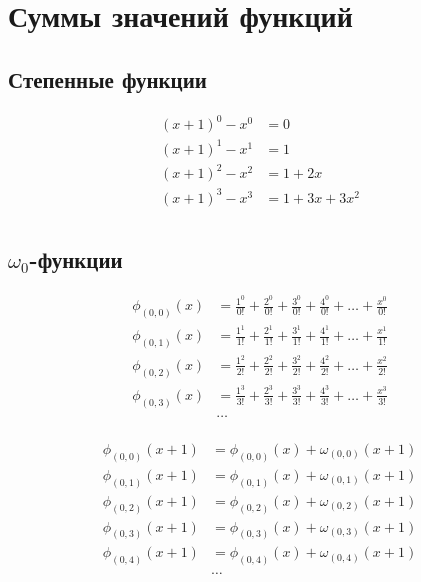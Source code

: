 
\section{Суммы значений функций}

\subsection{Степенные функции}

\begin{equation*}\begin{aligned}
(x + 1)^0 - x^0 &= 0 \\
(x + 1)^1 - x^1 &= 1 \\
(x + 1)^2 - x^2 &= 1 + 2x \\
(x + 1)^3 - x^3 &= 1 + 3x + 3x^2 \\
\end{aligned}\end{equation*}

\subsection{$\omega_0$-функции}

\begin{equation*} \begin{aligned}
\phi_{(0,0)}(x) &=
  \frac{1^0}{0!} 
+ \frac{2^0}{0!} 
+ \frac{3^0}{0!} 
+ \frac{4^0}{0!} 
+ \ldots 
+ \frac{x^0}{0!} \\
%
\phi_{(0,1)}(x) &= 
  \frac{1^1}{1!} 
+ \frac{2^1}{1!} 
+ \frac{3^1}{1!} 
+ \frac{4^1}{1!} 
+ \ldots 
+ \frac{x^1}{1!} \\
%
\phi_{(0,2)}(x) &= 
  \frac{1^2}{2!} 
+ \frac{2^2}{2!} 
+ \frac{3^2}{2!} 
+ \frac{4^2}{2!} 
+ \ldots 
+ \frac{x^2}{2!} \\
%
\phi_{(0,3)}(x) &= 
  \frac{1^3}{3!} 
+ \frac{2^3}{3!} 
+ \frac{3^3}{3!} 
+ \frac{4^3}{3!} 
+ \ldots 
+ \frac{x^3}{3!} \\
%
&\ldots \\
\end{aligned} \end{equation*}

\begin{equation*} \begin{aligned}
\phi_{(0,0)}(x + 1) &= 
  \phi_{(0,0)}(x) + \omega_{(0,0)}(x + 1)
\\
\phi_{(0,1)}(x + 1) &= 
  \phi_{(0,1)}(x) + \omega_{(0,1)}(x + 1)  
\\
\phi_{(0,2)}(x + 1) &= 
  \phi_{(0,2)}(x) + \omega_{(0,2)}(x + 1)  
\\
\phi_{(0,3)}(x + 1) &= 
  \phi_{(0,3)}(x) + \omega_{(0,3)}(x + 1)  
\\
\phi_{(0,4)}(x + 1) &= 
  \phi_{(0,4)}(x) + \omega_{(0,4)}(x + 1)  
\\
&\ldots \\
\end{aligned} \end{equation*}

